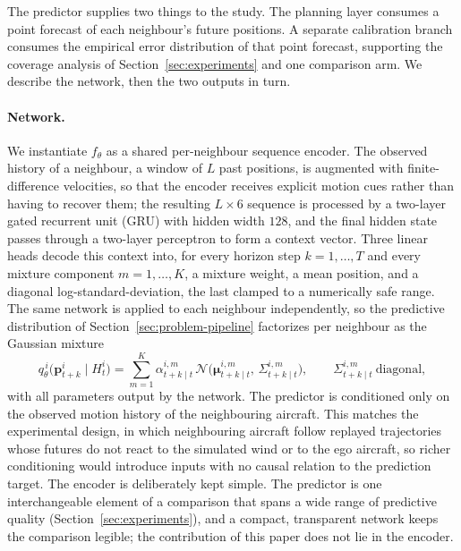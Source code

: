 \documentclass[11pt]{article}
\theoremstyle{plain}
\theoremstyle{definition}
\begin{document}
The predictor supplies two things to the study. The planning layer
consumes a point forecast of each neighbour's future positions. A
separate calibration branch consumes the empirical error distribution
of that point forecast, supporting the coverage analysis of
Section~\ref{sec:experiments} and one comparison arm. We describe the
network, then the two outputs in turn.
 
\paragraph{Network.}
We instantiate $f_{\theta}$ as a shared per-neighbour sequence
encoder. The observed history of a neighbour, a window of $L$ past
positions, is augmented with finite-difference velocities, so that the
encoder receives explicit motion cues rather than having to recover
them; the resulting $L \times 6$ sequence is processed by a two-layer
gated recurrent unit (GRU) with hidden width $128$, and the final
hidden state passes through a two-layer perceptron to form a context
vector. Three linear heads decode this context into, for every horizon
step $k = 1, \dots, T$ and every mixture component
$m = 1, \dots, K$, a mixture weight, a mean position, and a diagonal
log-standard-deviation, the last clamped to a numerically safe range.
The same network is applied to each neighbour independently, so the
predictive distribution of Section~\ref{sec:problem-pipeline}
factorizes per neighbour as the Gaussian mixture
\begin{equation}
	\label{eq:gmm-decoder}
	q^{\,i}_{\theta}\big( \bm{p}^{i}_{t+k} \mid H^i_t \big)
	= \sum_{m=1}^{K} \alpha^{i,m}_{t+k \mid t}\,
	\mathcal{N}\!\big( \bm{\mu}^{i,m}_{t+k \mid t},\,
	\Sigma^{i,m}_{t+k \mid t} \big),
	\qquad
	\Sigma^{i,m}_{t+k \mid t} \ \text{diagonal},
\end{equation}
with all parameters output by the network. The predictor is
conditioned only on the observed motion history of the neighbouring
aircraft. This matches
the experimental design, in which neighbouring aircraft follow replayed
trajectories whose futures do not react to the simulated wind or to the
ego aircraft, so richer conditioning would introduce inputs with no
causal relation to the prediction target. The encoder is deliberately
kept simple. The predictor is one interchangeable element of a
comparison that spans a wide range of predictive quality
(Section~\ref{sec:experiments}), and a compact, transparent network
keeps the comparison legible; the contribution of this paper does not
lie in the encoder.
 
\end{document}
